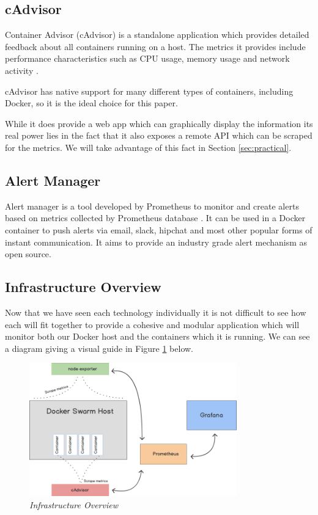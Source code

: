 \subsection{cAdvisor}
\label{subs:cAdvisor}
Container Advisor (cAdvisor) is a standalone application which provides detailed feedback about all containers running on a host. The metrics it provides include performance characteristics such as CPU usage, memory usage and network activity \citep{cAdvisor2017}. 

cAdvisor has native support for many different types of containers, including Docker, so it is the ideal choice for this paper.

While it does provide a web app which can graphically display the information its real power lies in the fact that it also exposes a remote API which can be scraped for the metrics. We will take advantage of this fact in Section \ref{sec:practical}.

\subsection{Alert Manager}
Alert manager is a tool developed by Prometheus to monitor and create alerts based on metrics collected by Prometheus database \citep{prometheus2017}. It can be used in a Docker container to push alerts via email, slack, hipchat and most other popular forms of instant communication. It aims to provide an industry grade alert mechanism as open source.

\subsection{Infrastructure Overview}
Now that we have seen each technology individually it is not difficult to see how each will fit together to provide a cohesive and modular application which will monitor both our Docker host and the containers which it is running. We can see a diagram giving a visual guide in Figure \ref{fig:infrastructure} below.

\begin{figure}[!h]
\centering
\includegraphics*[width=0.8\textwidth]{components/images/overview}
\caption{\em Infrastructure Overview}
\label{fig:infrastructure}
\end{figure}

